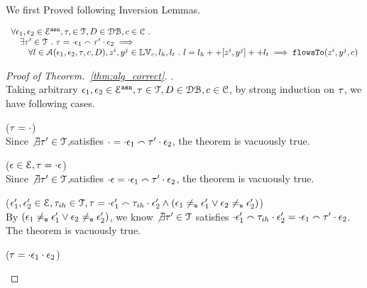 We first Proved following Inversion Lemmas.

\clearpage
\begin{thm}[Correctness]
\label{thm:alg_correct}
\[
\begin{array}{l}
  \forall \mathtt{\epsilon}_1, \mathtt{\epsilon}_2 \in \mathcal{E}^{\mathtt{{asn}}}, \mathtt{\tau}, \in \mathcal{T}, D \in \mathcal{DB} , c \in \mathcal{C} ~.~
  \\ \quad 
   \exists \mathtt{\tau}' \in \mathcal{T} ~.~ \mathtt{\tau} = \cdot \mathtt{\epsilon}_1 \smallfrown \mathtt{\tau}' \cdot \mathtt{\epsilon}_2
   \implies 
  \\ \qquad 
   \forall l \in \mathcal{A}(\mathtt{\epsilon}_1, \mathtt{\epsilon}_2, \mathtt{\tau}, c, D), z^i, y^j \in \mathbb{LV}_c, l_h, l_t ~.~ 
   l = l_h ++ [z^i, y^j] ++ l_t 
   \implies \mathtt{flowsTo}(z^i, y^j, c)
\end{array}
\]
\end{thm}

\begin{proof}[Proof of Theorem.~\ref{thm:alg_correct}].
\\
Taking arbitrary $\mathtt{\epsilon}_1, \mathtt{\epsilon}_2 \in \mathcal{E}^{\mathtt{{asn}}}, \mathtt{\tau} \in \mathcal{T}, D \in \mathcal{DB} , c \in \mathcal{C}$,
by strong induction on $\mathtt{\tau}$, we have following cases.
\begin{case}($\mathtt{\tau} = \cdot$)
\\
Since $\not\exists \mathtt{\tau}' \in \mathcal{T}$,satisfies $
\cdot  = \cdot {} \mathtt{\epsilon}_1 \smallfrown \mathtt{\tau}' \cdot \mathtt{\epsilon}_2$, the theorem is vacuously true.
\end{case}
%
\begin{case}($\mathtt{\epsilon} \in \mathcal{E}, \mathtt{\tau} = \cdot \mathtt{\epsilon}$)
\\
Since $\not\exists \mathtt{\tau}' \in \mathcal{T}$,satisfies $
\cdot  \mathtt{\epsilon} = \cdot \mathtt{\epsilon}_1 \smallfrown \mathtt{\tau}' \cdot \mathtt{\epsilon}_2$, the theorem is vacuously true.
\end{case}
%
\begin{case}($\mathtt{\epsilon}_1', \mathtt{\epsilon}_2' \in \mathcal{E}, \mathtt{\tau}_{ih} \in \mathcal{T}, 
\mathtt{\tau} = \cdot \mathtt{\epsilon}_1' \smallfrown \mathtt{\tau}_{ih} \cdot \mathtt{\epsilon}_2' \land 
(\mathtt{\epsilon}_1 \neq_{\mathtt{e}} \mathtt{\epsilon}_1' \lor \mathtt{\epsilon}_2 \neq_{\mathtt{e}} \mathtt{\epsilon}_2')$)
\\
By $(\mathtt{\epsilon}_1 \neq_{\mathtt{e}} \mathtt{\epsilon}_1' \lor \mathtt{\epsilon}_2 \neq_{\mathtt{e}} \mathtt{\epsilon}_2')$,
we know $\not\exists \mathtt{\tau}' \in \mathcal{T}$ satisfies $
\cdot \mathtt{\epsilon}_1' \smallfrown \mathtt{\tau}_{ih} \cdot \mathtt{\epsilon}_2' = \cdot \mathtt{\epsilon}_1 \smallfrown \mathtt{\tau}' \cdot \mathtt{\epsilon}_2$.
\\
The theorem is vacuously true.
\end{case}
%
%
\begin{case}
\label{case:alg_correct_base}
($\mathtt{\tau} = \cdot {} \mathtt{\epsilon}_1 \cdot {} \mathtt{\epsilon}_2$)

\end{case}
\end{proof}
